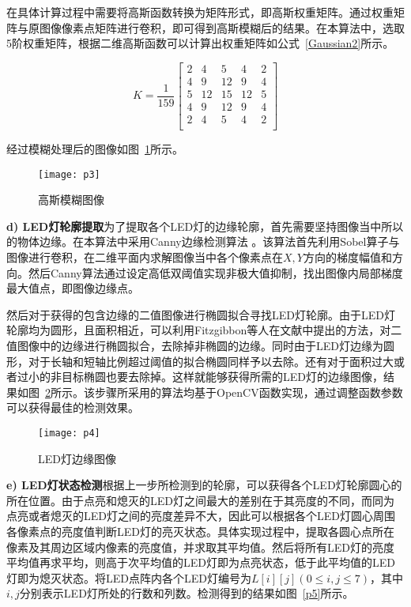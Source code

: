 在具体计算过程中需要将高斯函数转换为矩阵形式，即高斯权重矩阵。通过权重矩阵与原图像像素点矩阵进行卷积，即可得到高斯模糊后的结果。在本算法中，选取5阶权重矩阵，根据二维高斯函数可以计算出权重矩阵如公式~\ref{Gaussian2}所示。

\begin{equation}
K = \frac{1}{159}\left[
\begin{matrix}
2&4&5&4&2 \\
4&9&12&9&4 \\
5&12&15&12&5\\
4&9&12&9&4 \\
2&4&5&4&2 \\
\end{matrix}
\right]
  \label{Gaussian2}
\end{equation}

经过模糊处理后的图像如图~\ref{p3}所示。

\begin{figure}[H] 
  \centering
  \texttt{[image: p3]}
  \caption{高斯模糊图像}
  \label{p3}
\end{figure}

\textbf{d) LED灯轮廓提取}为了提取各个LED灯的边缘轮廓，首先需要坚持图像当中所以的物体边缘。在本算法中采用Canny边缘检测算法 \cite{canny1986computational}。该算法首先利用Sobel算子与图像进行卷积，在二维平面内求解图像当中各个像素点在$X, Y$方向的梯度幅值和方向。然后Canny算法通过设定高低双阈值实现非极大值抑制，找出图像内局部梯度最大值点，即图像边缘点。

然后对于获得的包含边缘的二值图像进行椭圆拟合寻找LED灯轮廓。由于LED灯轮廓均为圆形，且面积相近，可以利用Fitzgibbon等人在文献\cite{fitzgibbon1996buyer}中提出的方法，对二值图像中的边缘进行椭圆拟合，去除掉非椭圆的边缘。同时由于LED灯边缘为圆形，对于长轴和短轴比例超过阈值的拟合椭圆同样予以去除。还有对于面积过大或者过小的非目标椭圆也要去除掉。这样就能够获得所需的LED灯的边缘图像，结果如图~\ref{p4}所示。该步骤所采用的算法均基于OpenCV函数实现，通过调整函数参数可以获得最佳的检测效果。

\begin{figure}[H] 
  \centering
  \texttt{[image: p4]}
  \caption{LED灯边缘图像}
  \label{p4}
\end{figure}

\textbf{e) LED灯状态检测}根据上一步所检测到的轮廓，可以获得各个LED灯轮廓圆心的所在位置。由于点亮和熄灭的LED灯之间最大的差别在于其亮度的不同，而同为点亮或者熄灭的LED灯之间的亮度差异不大，因此可以根据各个LED灯圆心周围各像素点的亮度值判断LED灯的亮灭状态。具体实现过程中，提取各圆心点所在像素及其周边区域内像素的亮度值，并求取其平均值。然后将所有LED灯的亮度平均值再求平均，则高于次平均值的LED灯即为点亮状态，低于此平均值的LED灯即为熄灭状态。将LED点阵内各个LED灯编号为$L[i][j] (0 \le i, j \le 7)$，其中$i, j$分别表示LED灯所处的行数和列数。检测得到的结果如图~\ref{p5}所示。
 
